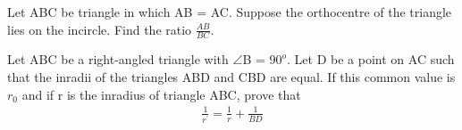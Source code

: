 \item Let ABC be triangle in which AB = AC. Suppose the orthocentre of the triangle lies on the incircle. Find the ratio $\frac{AB}{BC}$.

\item Let ABC be a right-angled triangle with $\angle$B = $90^{o}$. Let D be a point on AC
such that the inradii of the triangles ABD and CBD are equal. If this common
value is $r_0$ and if r is the inradius of triangle ABC, prove that
\begin{align*}
\frac{1}{r^{'}} = \frac{1}{r} + \frac{1}{BD} 
\end{align*}
























